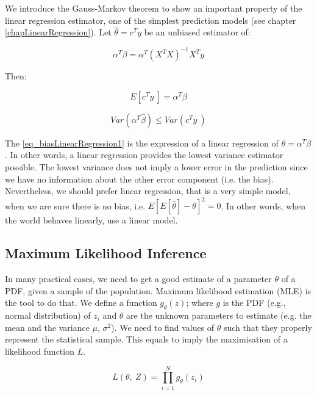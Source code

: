 We introduce the Gauss-Markov theorem to show an important property of the linear regression estimator, one of the simplest prediction models (see chapter \ref{chapLinearRegression}). Let $\hat{\theta}=c^Ty$ be an unbiased estimator of:

\begin{equation}
\alpha^T\beta=\alpha^T\left(X^TX\right)^{-1}X^Ty
\label{eq_biasLinearRegression1}
\end{equation}

Then:

\begin{equation}
E\left[c^Ty\ \right]=\alpha^T\beta
\label{eq_biasLinearRegression2}
\end{equation}

\begin{equation}
Var\left(\alpha^T\hat{\beta}\right)\le Var(c^Ty\ )
\label{eq_biasLinearRegression3}
\end{equation}

The \ref{eq_biasLinearRegression1} is the expression of a linear regression of $\theta=\alpha^T\beta$. In other words, a linear regression  provides the lowest variance estimator possible. The lowest variance does not imply a lower error in the prediction since we have no information about the other error component (i.e. the bias). Nevertheless, we should prefer linear regression, that is a very simple model, when we are sure there is no bias, i.e. $E\left[E\left[\hat{\theta}\right]-\theta\right]^2=0$. In other words, when the world behaves linearly, use a linear model.

\subsection{Maximum Likelihood Inference}
In many practical cases, we need to get a good estimate of a parameter $\theta$ of a PDF, given a sample of the population. Maximum likelihood estimation (MLE) is the tool to do that. We define a function $g_\theta(z)$; where $g$ is the PDF (e.g., normal distribution) of $z_i$ and $\theta$ are the unknown parameters to estimate (e.g. the mean and the variance $\mu$, $\sigma^2$). We need to find values of $\theta$ such that they properly represent the statistical sample. This equals to imply the maximisation of a likelihood function $L$.

\begin{equation}
L\left(\theta,\ Z\right)=\prod_{i=1}^{N}{g_\theta(z_i)}
\label{eq_MLE1}
\end{equation}

